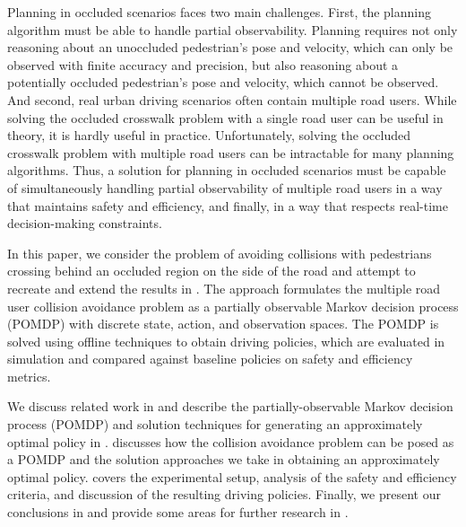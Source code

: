 \documentclass[conference]{IEEEtran}
\begin{document}
Planning in occluded scenarios faces two main challenges. First, the planning algorithm must be able to handle partial observability. Planning requires not only reasoning about an unoccluded pedestrian's pose and velocity, which can only be observed with finite accuracy and precision, but also reasoning about a potentially occluded pedestrian's pose and velocity, which cannot be observed. And second, real urban driving scenarios often contain multiple road users. While solving the occluded crosswalk problem with a single road user can be useful in theory, it is hardly useful in practice. Unfortunately, solving the occluded crosswalk problem with multiple road users can be intractable for many planning algorithms. Thus, a solution for planning in occluded scenarios must be capable of simultaneously handling partial observability of multiple road users in a way that maintains safety and efficiency, and finally, in a way that respects real-time decision-making constraints.

In this paper, we consider the problem of avoiding collisions with pedestrians crossing behind an occluded region on the side of the road and attempt to recreate and extend the results in \cite{Bouton2018ScalableDriving}. The approach formulates the multiple road user collision avoidance problem as a partially observable Markov decision process (POMDP) with discrete state, action, and observation spaces. The POMDP is solved using offline techniques to obtain driving policies, which are evaluated in simulation and compared against baseline policies on safety and efficiency metrics. 

We discuss related work in  and describe the partially-observable Markov decision process (POMDP) and solution techniques for generating an approximately optimal policy in .  discusses how the collision avoidance problem can be posed as a POMDP and the solution approaches we take in obtaining an approximately optimal policy.  covers the experimental setup, analysis of the safety and efficiency criteria, and discussion of the resulting driving policies. Finally, we present our conclusions in  and provide some areas for further research in .
\end{document}
